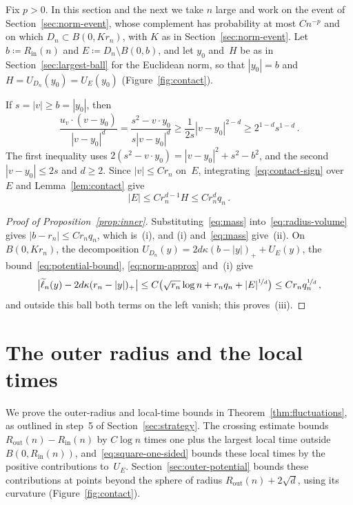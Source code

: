 \documentclass[11pt]{amsart}
\theoremstyle{plain}
\theoremstyle{definition}
\newcommand{\drift}{\kappa}
\newcommand{\nf}{\nicefrac}
\newcommand{\Rin}{R_{\mathrm{in}}}
\newcommand{\Rout}{R_{\mathrm{out}}}
\numberwithin{equation}{section}
\begin{document}
Fix $p>0$. In this section and the next we take $n$ large and work on the event of Section~\ref{sec:norm-event}, whose complement has probability at most $Cn^{-p}$ and on which $D_n\subset B(0,Kr_n)$, with $K$ as in Section~\ref{sec:norm-event}. Let $b\coloneqq\Rin(n)$ and $E\coloneqq D_n\setminus B(0,b)$, and let $y_0$ and~$H$ be as in Section~\ref{sec:largest-ball} for the Euclidean norm, so that $|y_0|=b$ and $H=U_{D_n}(y_0)=U_E(y_0)$ (Figure~\ref{fig:contact}).

If $s=|v|\geq b=|y_0|$, then
\begin{equation}\label{eq:contact-sign}
\frac{u_v\cdot(v-y_0)}{|v-y_0|^d}
=\frac{s^2-v\cdot y_0}{s|v-y_0|^d}
\geq\frac1{2s}|v-y_0|^{2-d}
\geq2^{1-d}s^{1-d}\, .
\end{equation}
The first inequality uses $2(s^2-v\cdot y_0)=|v-y_0|^2+s^2-b^2$, and the second $|v-y_0|\leq2s$ and $d\geq2$. Since $|v|\leq Cr_n$ on~$E$, integrating~\eqref{eq:contact-sign} over~$E$ and Lemma~\ref{lem:contact} give
\begin{equation}\label{eq:mass}
|E|\leq Cr_n^{d-1}H\leq Cr_n^dq_n\, .
\end{equation}

\begin{proof}[Proof of Proposition~\ref{prop:inner}]
Substituting~\eqref{eq:mass} into~\eqref{eq:radius-volume} gives $|b-r_n|\leq Cr_nq_n$, which is~(i), and (i) and~\eqref{eq:mass} give~(ii). On~$B(0,Kr_n)$, the decomposition $U_{D_n}(y)=2d\drift(b-|y|)_++U_E(y)$, the bound~\eqref{eq:potential-bound}, \eqref{eq:norm-approx} and~(i) give
\begin{equation*}
\bigl|\widetilde\ell_n(y)-2d\drift(r_n-|y|)_+\bigr|
\leq C\bigl(\sqrt{r_n}\log n+r_nq_n+|E|^{\nf1d}\bigr)\leq Cr_nq_n^{\nf1d}\, ,
\end{equation*}
and outside this ball both terms on the left vanish; this proves~(iii).
\end{proof}

\section{The outer radius and the local times}\label{sec:outer}

We prove the outer-radius and local-time bounds in Theorem~\ref{thm:fluctuations}, as outlined in step~5 of Section~\ref{sec:strategy}. The crossing estimate bounds $\Rout(n)-\Rin(n)$ by $C\log n$ times one plus the largest local time outside~$B(0,\Rin(n))$, and~\eqref{eq:square-one-sided} bounds these local times by the positive contributions to~$U_E$. Section~\ref{sec:outer-potential} bounds these contributions at points beyond the sphere of radius $\Rout(n)+2\sqrt d$, using its curvature (Figure~\ref{fig:contact}).
\end{document}
